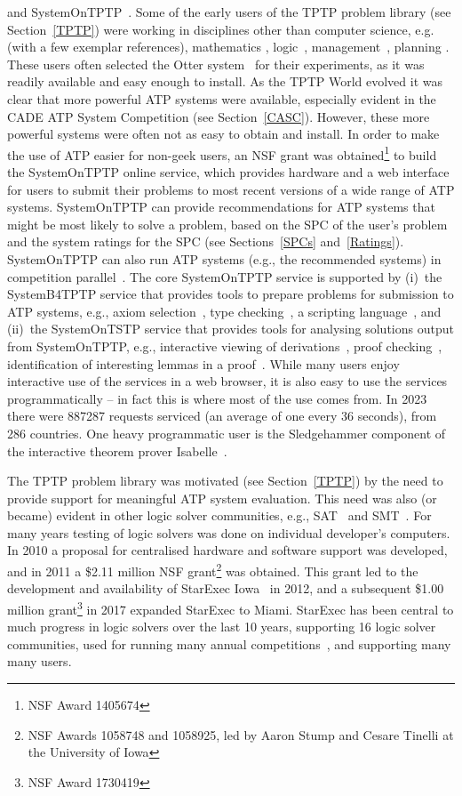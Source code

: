 \documentclass[runningheads]{llncs}
\begin{document}
and SystemOnTPTP~\cite{Sut00-CADE-17}.
Some of the early users of the TPTP problem library (see Section~\ref{TPTP}) were working in
disciplines other than computer science, e.g. (with a few exemplar references), mathematics 
\cite{Qua92-Book,MP96}, logic~\cite{GO86,Jec95}, management~\cite{PB+92-TR,PM94}, planning 
\cite{SE94}.
These users often selected the Otter system~\cite{McC03-Otter} for their experiments, as
it was readily available and easy enough to install. 
As the TPTP World evolved it was clear that more powerful ATP systems were available, especially 
evident in the CADE ATP System Competition (see Section~\ref{CASC}).
However, these more powerful systems were often not as easy to obtain and install.
In order to make the use of ATP easier for non-geek users, an NSF grant was obtained\footnote{%
NSF Award 1405674} to build the SystemOnTPTP online service, which provides hardware and a web 
interface for users to submit their problems to most recent versions of a wide range of ATP 
systems.
SystemOnTPTP can provide recommendations for ATP systems that might be most likely to solve
a problem, based on the SPC of the user's problem and the system ratings for the SPC
(see Sections~\ref{SPCs} and~\ref{Ratings}). 
SystemOnTPTP can also run ATP systems (e.g., the recommended systems) in competition
parallel~\cite{SS99-FLAIRS}.
The core SystemOnTPTP service is supported by (i)~the SystemB4TPTP service that provides tools to
prepare problems for submission to ATP systems, e.g., axiom selection~\cite{HV11}, type 
checking~\cite{KSR16}, a scripting language~\cite{Sut14}, and (ii)~the SystemOnTSTP service that 
provides tools for analysing solutions output from SystemOnTPTP, 
e.g., interactive viewing of derivations~\cite{TPS07}, proof checking~\cite{Sut06}, identification 
of interesting lemmas in a proof~\cite{PGS06}.
While many users enjoy interactive use of the services in a web browser, it is also easy to use 
the services programmatically -- in fact this is where most of the use comes from.
In 2023 there were 887287 requests serviced (an average of one every 36 seconds), from 286 
countries.
One heavy programmatic user is the Sledgehammer component of the interactive theorem prover
Isabelle~\cite{PB10}.

The TPTP problem library was motivated (see Section~\ref{TPTP}) by the need to provide support
for meaningful ATP system evaluation.
This need was also (or became) evident in other logic solver communities, e.g., 
SAT~\cite{HS00-SATLIB} and SMT~\cite{CSW15}.
For many years testing of logic solvers was done on individual developer's computers. 
In 2010 a proposal for centralised hardware and software support was developed,
and in 2011 a \$2.11 million NSF grant\footnote{%
NSF Awards 1058748 and 1058925, led by Aaron Stump and Cesare Tinelli at the University of Iowa} 
was obtained.
This grant led to the development and availability of StarExec Iowa~\cite{SST14} in 2012,
and a subsequent \$1.00 million grant\footnote{%
NSF Award 1730419} in 2017 expanded StarExec to Miami.
StarExec has been central to much progress in logic solvers over the last 10 years, supporting
16 logic solver communities, used for running many annual competitions~\cite{BB+19}, and 
supporting many many users.
\end{document}
